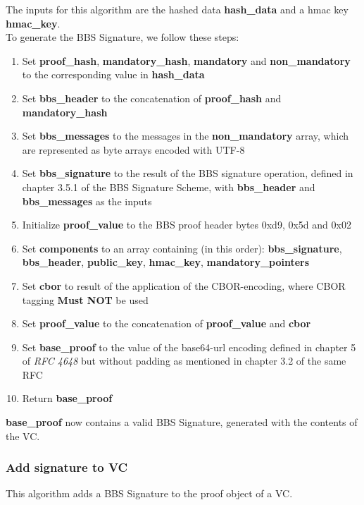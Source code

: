 \documentclass[
	a4paper               %
	,BCOR=0mm            %
	,bibliography=totoc   %
	,listof=totoc         %
	,monolingual
	,twoside=false
]{bfhthesis}              %
\begin{document}
The inputs for this algorithm are the hashed data \textbf{hash\_data} and a hmac key \textbf{hmac\_key}.\\

To generate the BBS Signature, we follow these steps:
\begin{enumerate}
	\item Set \textbf{proof\_hash}, \textbf{mandatory\_hash}, \textbf{mandatory} and \textbf{non\_mandatory} to the corresponding value in \textbf{hash\_data}
	\item Set \textbf{bbs\_header} to the concatenation of \textbf{proof\_hash} and \textbf{mandatory\_hash}
	\item Set \textbf{bbs\_messages} to the messages in the \textbf{non\_mandatory} array, which are represented as byte arrays encoded with UTF-8
	\item Set \textbf{bbs\_signature} to the result of the BBS signature operation, defined in chapter 3.5.1 of the BBS Signature Scheme\cite{bbs-signature-scheme}, with \textbf{bbs\_header} and \textbf{bbs\_messages} as the inputs
	\item Initialize \textbf{proof\_value} to the BBS proof header bytes 0xd9, 0x5d and 0x02
	\item Set \textbf{components} to an array containing (in this order): \textbf{bbs\_signature}, \textbf{bbs\_header}, \textbf{public\_key}, \textbf{hmac\_key}, \textbf{mandatory\_pointers}
	\item Set \textbf{cbor} to result of the application of the CBOR-encoding\cite{cbor}, where CBOR tagging \textbf{Must NOT} be used
	\item Set \textbf{proof\_value} to the concatenation of \textbf{proof\_value} and \textbf{cbor}
	\item Set \textbf{base\_proof} to the value of the base64-url encoding defined in chapter 5 of \textit{RFC 4648}\cite{base64} but without padding as mentioned in chapter 3.2 of the same RFC
	\item Return \textbf{base\_proof}
\end{enumerate}

\textbf{base\_proof} now contains a valid BBS Signature, generated with the contents of the VC.

\subsubsection{Add signature to VC}
\label{subsubsec:addsig}
This algorithm adds a BBS Signature to the proof object of a VC.\\
\end{document}
